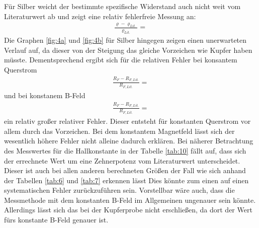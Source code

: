 Für Silber weicht der bestimmte spezifische Widerstand auch nicht weit vom Literaturwert ab und zeigt eine relativ fehlerfreie Messung an:
\begin{align}
    \frac{\varrho - \varrho_{Lit.}}{\varrho_{Lit.}} = \text{}
\end{align}
Die Graphen \ref{fig:4a} und \ref{fig:4b} für Silber hingegen zeigen einen unerwarteten Verlauf auf, da dieser
von der Steigung das gleiche Vorzeichen wie Kupfer haben müsste.
Dementsprechend ergibt sich für die relativen Fehler bei konsantem Querstrom
\begin{align}
    \frac{R_F - R_{F,Lit.}}{R_{F,Lit.}} = \text{}
\end{align}
und bei konstanem B-Feld
\begin{align}
    \frac{R_F - R_{F,Lit.}}{R_{F,Lit.}} = \text{}
\end{align}
ein relativ großer relativer Fehler. Dieser entsteht für konstanten Querstrom vor allem 
durch das Vorzeichen. Bei dem konstantem Magnetfeld lässt sich der wesentlich höhere Fehler 
nicht alleine dadurch erklären. Bei näherer Betrachtung des Messwertes für die Hallkonstante 
in der Tabelle \ref{tab:10} fällt auf, dass sich der errechnete Wert um eine Zehnerpotenz
vom Literaturwert unterscheidet. Dieser ist auch bei allen anderen berechneten Größen der Fall
wie sich anhand der Tabellen \ref{tab:6} und \ref{tab:7} erkennen lässt
Dies könnte zum einen auf einen systematischen 
Fehler zurückzuführen sein. Vorstellbar wäre auch, dass die Messmethode mit dem 
konstanten B-Feld im Allgemeinen ungenauer sein könnte. Allerdings lässt sich das
bei der Kupferprobe nicht erschließen, da dort der Wert fürs konstante B-Feld genauer ist.



